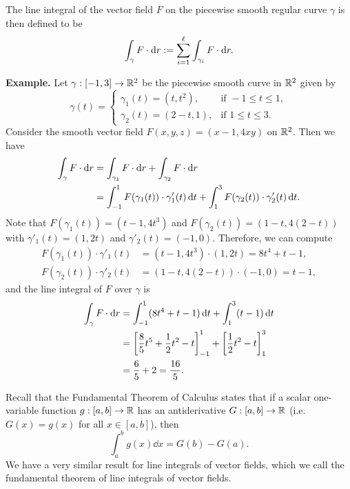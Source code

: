 The line integral of the vector field $F$ on the piecewise smooth regular 
curve $\gamma$ is then defined to be 
\[ \int_\gamma F\cdot{\rm d}r := \sum_{i=1}^\ell \int_{\gamma_i} F\cdot{\rm d}r. \] 

{\bf Example.} Let $\gamma : [-1, 3] \to \mathbb{R}^2$ be the piecewise smooth curve 
in $\mathbb{R}^2$ given by 
\[ \gamma(t) = \begin{cases}
    \gamma_1(t) = (t, t^2), & \text{if } -1 \leq t \leq 1, \\ 
    \gamma_2(t) = (2-t, 1), & \text{if } 1 \leq t \leq 3. 
\end{cases} \] 
Consider the smooth vector field $F(x, y, z) = (x-1, 4xy)$ on $\mathbb{R}^2$. Then 
we have 
\begin{align*} 
    \int_\gamma F\cdot{\rm d}r 
    &= \int_{\gamma_1} F\cdot{\rm d}r + \int_{\gamma_2} F\cdot{\rm d}r \\ 
    &= \int_{-1}^1 F(\gamma_1(t)) \cdot \gamma'_1(t)\,\mathrm{d} t 
    + \int_1^3 F(\gamma_2(t)) \cdot \gamma'_2(t) \,\mathrm{d} t. 
\end{align*} 
Note that $F(\gamma_1(t)) = (t-1, 4t^3)$ and $F(\gamma_2(t)) = 
(1-t, 4(2-t))$ with $\gamma'_1(t) = (1, 2t)$ and $\gamma'_2(t) = 
(-1, 0)$. Therefore, we can compute 
\begin{align*}
    F(\gamma_1(t)) \cdot \gamma'_1(t) &= (t-1, 4t^3) \cdot (1, 2t) = 
    8t^4 + t - 1, \\ 
    F(\gamma_2(t)) \cdot \gamma'_2(t) &= (1-t, 4(2-t)) \cdot (-1, 0) = 
    t-1, 
\end{align*}
and the line integral of $F$ over $\gamma$ is 
\begin{align*} 
    \int_\gamma F\cdot{\rm d}r 
    &= \int_{-1}^1 (8t^4 + t - 1)\,\mathrm{d} t + \int_1^3 (t-1)\,\mathrm{d} t \\ 
    &= \left[ \frac85t^5 + \frac12t^2 - t\right]_{-1}^1 + 
    \left[ \frac12 t^2 - t \right]_1^3 \\ 
    &= \frac65 + 2 = \frac{16}{5}. 
\end{align*} 

Recall that the Fundamental Theorem of Calculus states that if a 
scalar one-variable function $g : [a, b] \to \mathbb{R}$ has an antiderivative 
$G : [a, b] \to \mathbb{R}$ (i.e. $G(x) = g(x)$ for all $x \in [a, b]$), then 
\[ \int_a^b g(x)\dd x = G(b) - G(a). \] 
We have a very similar result for line integrals of vector fields, which we 
call the fundamental theorem of line integrals of vector fields. 


